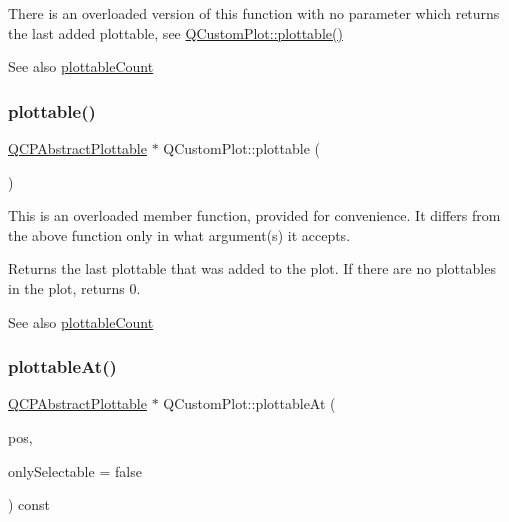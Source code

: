 There is an overloaded version of this function with no parameter which returns the last added plottable, see \hyperlink{classQCustomPlot_adea38bdc660da9412ba69fb939031567}{Q\+Custom\+Plot\+::plottable()}

\begin{DoxySeeAlso}{See also}
\hyperlink{classQCustomPlot_a5f4f15991c14bf9ad659bb2a19dfbed4}{plottable\+Count} 
\end{DoxySeeAlso}
\mbox{\label{classQCustomPlot_adea38bdc660da9412ba69fb939031567}} 
\subsubsection{\texorpdfstring{plottable()}{plottable()}\hspace{0.1cm}{\footnotesize\ttfamily [2/2]}}
{\footnotesize\ttfamily \hyperlink{classQCPAbstractPlottable}{Q\+C\+P\+Abstract\+Plottable} $\ast$ Q\+Custom\+Plot\+::plottable (\begin{DoxyParamCaption}{ }\end{DoxyParamCaption})}

This is an overloaded member function, provided for convenience. It differs from the above function only in what argument(s) it accepts.

Returns the last plottable that was added to the plot. If there are no plottables in the plot, returns 0.

\begin{DoxySeeAlso}{See also}
\hyperlink{classQCustomPlot_a5f4f15991c14bf9ad659bb2a19dfbed4}{plottable\+Count} 
\end{DoxySeeAlso}
\mbox{\label{classQCustomPlot_acddbbd8b16dd633f0d94e5a736fbd8cf}} 
\subsubsection{\texorpdfstring{plottable\+At()}{plottableAt()}}
{\footnotesize\ttfamily \hyperlink{classQCPAbstractPlottable}{Q\+C\+P\+Abstract\+Plottable} $\ast$ Q\+Custom\+Plot\+::plottable\+At (\begin{DoxyParamCaption}\item[{const Q\+PointF \&}]{pos,  }\item[{bool}]{only\+Selectable = {\ttfamily false} }\end{DoxyParamCaption}) const}


